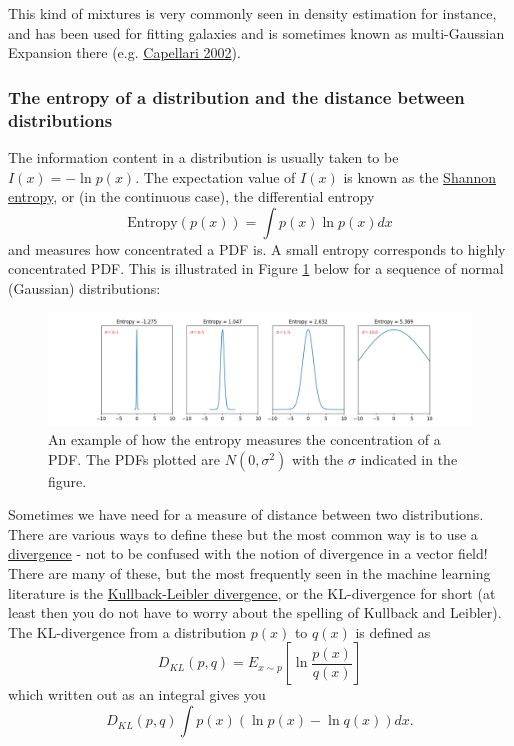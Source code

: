 \documentclass[a4paper,10pt]{article}
\newcommand{\link}[2]{{\color{blue}\href{#1}{#2}}}
\begin{document}
This kind of mixtures is very commonly seen in density estimation for instance, and has been used for fitting galaxies and is sometimes known as multi-Gaussian Expansion there (e.g. \link{http://adsabs.harvard.edu/abs/2002MNRAS.333..400C}{Capellari 2002}). 


\subsubsection{ The entropy of a distribution and the distance between distributions}

The information content in a distribution is usually taken to be $I(x) = -\ln p(x)$. The expectation value of $I(x)$ is known as the \link{https://en.wikipedia.org/wiki/Entropy_(information_theory)}{Shannon entropy}, or (in the continuous case), the differential entropy
$$\mathrm{Entropy}(p(x)) = \int p(x) \ln p(x) dx $$ and measures how concentrated a PDF is. A small entropy corresponds to highly concentrated PDF. This is illustrated in Figure \ref{fig:entr} below for a sequence of normal (Gaussian) distributions:

\begin{figure}[!h]
\includegraphics[width=\textwidth]{entropy_example.png}
\caption{An example of how the entropy measures the concentration of a PDF. The PDFs plotted are $N(0, \sigma^2)$ with the $\sigma$ indicated in the figure.}
\label{fig:entr}
\end{figure}


Sometimes we have need for a measure of distance between two distributions. There are various ways to define these but the most common way is to use a \link{https://en.wikipedia.org/wiki/Divergence_(statistics)}{divergence} - not to be confused with the notion of divergence in a vector field! There are many of these, but the most frequently seen in the machine learning literature is the \link{https://en.wikipedia.org/wiki/Kullback\%E2\%80\%93Leibler_divergence}{Kullback-Leibler divergence}, or the KL-divergence for short (at least then you do not have to worry about the spelling of Kullback and Leibler). The KL-divergence from a distribution $p(x)$ to $q(x)$ is defined as
$$D_{KL}(p, q) = E_{x\sim p} \left[\ln \frac{p(x)}{q(x)} \right]$$
which written out as an integral gives you 
$$D_{KL}(p, q)\int p(x) \left( \ln p(x) -\ln q(x) \right) dx.$$
\end{document}
